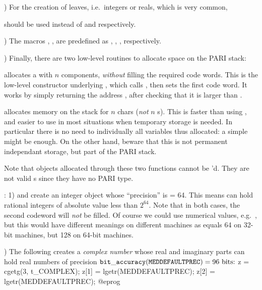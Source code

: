 ) For the creation of leaves, i.e.~integers or reals, which is
very common,



\noindent should be used instead of  and
 respectively.

) The macros , ,  are predefined
as , , , respectively.

) Finally, there are two low-level routines to allocate space on
the PARI stack:


allocates a  with $n$ components, \emph{without} filling the
required code words. This is the low-level constructor underlying
, which calls , then sets the first code word. It
works by simply returning the address , after checking
that it is larger than .


allocates memory on the stack for $n$ chars (\emph{not} $n$ s). This
is faster than using , and easier to use in most situations when
temporary storage is needed. In particular there is no need to 
individually all variables thus allocated: a simple 
might be enough. On the other hand, beware that this is not permanent
independant storage, but part of the PARI stack.

Note that objects allocated through these two functions cannot be
'd. They are not valid s since they have no PARI type.

: 1)  and
 create an integer object whose ``precision''
is  = 64. This means  can hold
rational integers of absolute value less than $2^{64}$. Note that in both
cases, the second codeword will \emph{not} be filled. Of course we could use
numerical values, e.g.~, but this would have different meanings
on different machines as  equals 64 on 32-bit machines,
but 128 on 64-bit machines.

) The following creates a \emph{complex number} whose real and
imaginary parts can hold real numbers of precision
${\tt bit\_accuracy(MEDDEFAULTPREC)} = 96\hbox{ bits:}$
%
\bprog
  z = cgetg(3, t_COMPLEX);
  z[1] = lgetr(MEDDEFAULTPREC);
  z[2] = lgetr(MEDDEFAULTPREC);
@eprog

